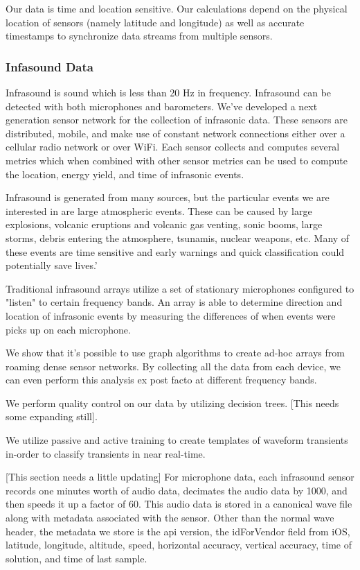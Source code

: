 Our data is time and location sensitive. Our calculations depend on the physical location of sensors (namely latitude and longitude) as well as accurate timestamps to synchronize data streams from multiple sensors.

\subsubsection{Infasound Data}

Infrasound is sound which is less than 20 Hz in frequency. Infrasound can be detected with both microphones and barometers. We've developed a next generation sensor network for the collection of infrasonic data. These sensors are distributed, mobile, and make use of constant network connections either over a cellular radio network or over WiFi. Each sensor collects and computes several metrics which when combined with other sensor metrics can be used to compute the location, energy yield, and time of infrasonic events.

Infrasound is generated from many sources, but the particular events we are interested in are large atmospheric events. These can be caused by large explosions, volcanic eruptions and volcanic gas venting, sonic booms, large storms, debris entering the atmosphere, tsunamis, nuclear weapons, etc. Many of these events are time sensitive and early warnings and quick classification could potentially save lives.'

Traditional infrasound arrays utilize a set of stationary microphones configured to "listen" to certain frequency bands. An array is able to determine direction and location of infrasonic events by measuring the differences of when events were picks up on each microphone. 

We show that it's possible to use graph algorithms to create ad-hoc arrays from roaming dense sensor networks. By collecting all the data from each device, we can even perform this analysis ex post facto at different frequency bands.

We perform quality control on our data by utilizing decision trees. [This needs some expanding still].

We utilize passive and active training to create templates of waveform transients in-order to classify transients in near real-time.

[This section needs a little updating]
For microphone data, each infrasound sensor records one minutes worth of audio data, decimates the audio data by 1000, and then speeds it up a factor of 60. This audio data is stored in a canonical wave file along with metadata associated with the sensor. Other than the normal wave header, the metadata we store is the api version, the idForVendor field from iOS, latitude, longitude, altitude, speed, horizontal accuracy, vertical accuracy, time of solution, and time of last sample.

